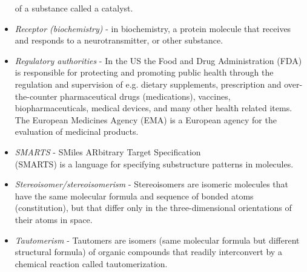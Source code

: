 \documentclass{sig-alternate}
\begin{document}
\begin{itemize}
    of a substance called a catalyst.
\item \textit{Receptor (biochemistry)} - in biochemistry, a protein molecule that receives and responds to a
    neurotransmitter, or other substance.
\item \textit{Regulatory authorities} - In the US the Food and Drug Administration (FDA) is responsible for
    protecting and promoting public health through the regulation and supervision of e.g. dietary supplements,
    prescription and over-the-counter pharmaceutical drugs (medications), vaccines, biopharmaceuticals, medical
    devices, and many other health related items. The European Medicines Agency (EMA) is a European agency for the
    evaluation of medicinal products.
\item \textit{SMARTS} - SMiles ARbitrary Target Specification \\(SMARTS) is a language for specifying substructure
    patterns in molecules.
\item \textit{Stereoisomer/stereoisomerism} - Stereoisomers are isomeric molecules that have the same molecular
    formula and sequence of bonded atoms (constitution), but that differ only in the three-dimensional orientations
    of their atoms in space.
\item \textit{Tautomerism} - Tautomers are isomers (same molecular formula but different structural formula) of
    organic compounds that readily interconvert by a chemical reaction called tautomerization.
\end{itemize}
%
\end{document}
